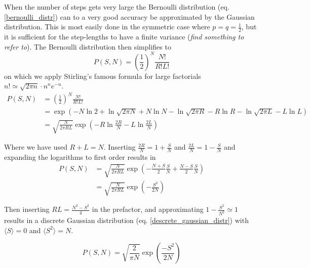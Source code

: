 When the number of steps gets very large the Bernoulli distribution (eq. \ref{bernoulli_distr}) can to a very good accuracy be approximated by the Gaussian distribution. 
This is most easily done in the symmetric case where $p=q=\frac{1}{2}$, but it is sufficient for the step-lengths to have a finite variance (\emph{find something to refer to}). 
The Bernoulli distribution then simplifies to
\begin{equation}
 P(S,N) = \left(\frac{1}{2}\right)^N\frac{N!}{R!L!}
\end{equation}
on which we apply Stirling's famous formula for large factorials $n!\simeq\sqrt{2\pi n}\cdot n^ne^{-n}$.
\begin{align*}
 P(S,N) &= \left(\frac{1}{2}\right)^N\frac{N!}{R!L!} \\
 &= \exp\left(-N\ln2+\ln\sqrt{2\pi N}+N\ln N - \ln\sqrt{2\pi R} -R\ln R - \ln\sqrt{2\pi L} - L\ln L \right) \\
 &= \sqrt{\frac{N}{2\pi RL}}\exp\left(-R\ln\frac{2R}{N}-L\ln\frac{2L}{N}\right)
\end{align*}

Where we have used $R+L=N$. 
Inserting $\frac{2R}{N}=1+\frac{S}{N}$ and $\frac{2L}{N}=1-\frac{S}{N}$ and expanding the logarithms to first order results in
\begin{align*}
 P(S,N) &= \sqrt{\frac{N}{2\pi RL}}\exp\left(-\frac{N+S}{2}\frac{S}{N} + \frac{N-S}{2}\frac{S}{N}\right)\\
 &= \sqrt{\frac{N}{2\pi RL}}\exp\left(-\frac{S^2}{2N}\right)
\end{align*}

Then inserting $RL=\frac{N^2-S^2}{4}$ in the prefactor, and approximating $1-\frac{S^2}{N^2}\simeq1$ results in a discrete Gaussian distribution (eq. \ref{descrete_gaussian_distr}) with $\langle S\rangle = 0$  and $\langle S^2\rangle = N$.

\begin{equation}\label{descrete_gaussian_distr}
 P(S,N) =\sqrt{\frac{2}{\pi N}}\exp\left(\frac{-S^2}{2N}\right)
\end{equation}

